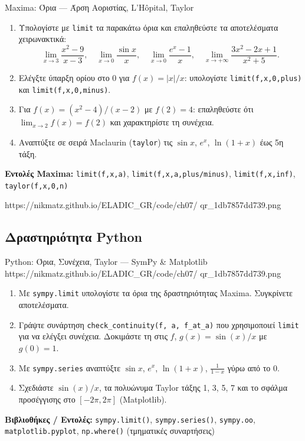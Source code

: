%

\casactivbox%
  {Maxima: Όρια — Άρση Αοριστίας, L'Hôpital, Taylor}%
  {%
    \label{cas:ch7_limits}
    \begin{enumerate}[label=(\alph*),itemsep=2pt]
      \item Υπολογίστε με \texttt{limit} τα παρακάτω όρια και
        επαληθεύστε τα αποτελέσματα χειρωνακτικά:
        \[
          \lim_{x\to 3}\frac{x^2-9}{x-3}, \quad
          \lim_{x\to 0}\frac{\sin x}{x}, \quad
          \lim_{x\to 0}\frac{e^x-1}{x}, \quad
          \lim_{x\to+\infty}\frac{3x^2-2x+1}{x^2+5}.
        \]
      \item Ελέγξτε ύπαρξη ορίου στο 0 για $f(x)=|x|/x$:
        υπολογίστε \texttt{limit(f,x,0,plus)} και
        \texttt{limit(f,x,0,minus)}.
      \item Για $f(x)=(x^2-4)/(x-2)$ με $f(2)=4$: επαληθεύστε
        ότι $\lim_{x\to 2}f(x)=f(2)$ και χαρακτηρίστε τη
        συνέχεια.
      \item Αναπτύξτε σε σειρά Maclaurin (\texttt{taylor}) τις
        $\sin x$, $e^x$, $\ln(1+x)$ έως 5η τάξη.
    \end{enumerate}
    \smallskip
    \textbf{Εντολές Maxima:}
    \texttt{limit(f,x,a)}, \texttt{limit(f,x,a,plus/minus)},
    \texttt{limit(f,x,inf)}, \texttt{taylor(f,x,0,n)}
  }%
  {https://nikmatz.github.io/ELADIC_GR/code/ch07/}%
  {qr_1db7857dd739.png}

\subsection*{Δραστηριότητα Python}

\begin{pybox}{Python: Όρια, Συνέχεια, Taylor — SymPy \& Matplotlib}%
             {https://nikmatz.github.io/ELADIC_GR/code/ch07/}%
             {qr_1db7857dd739.png}
\label{py:ch7_limits}
\begin{enumerate}[label=(\alph*),itemsep=2pt]
  \item Με \texttt{sympy.limit} υπολογίστε τα όρια της
    δραστηριότητας Maxima. Συγκρίνετε αποτελέσματα.
  \item Γράψτε συνάρτηση \texttt{check\_continuity(f, a, f\_at\_a)}
    που χρησιμοποιεί \texttt{limit} για να ελέγξει συνέχεια.
    Δοκιμάστε τη στις $f$, $g(x)=\sin(x)/x$ με $g(0)=1$.
  \item Με \texttt{sympy.series} αναπτύξτε $\sin x$, $e^x$,
    $\ln(1+x)$, $\frac{1}{1-x}$ γύρω από το 0.
  \item Σχεδιάστε $\sin(x)/x$, τα πολυώνυμα Taylor τάξης
    1, 3, 5, 7 και το σφάλμα προσέγγισης στο $[-2\pi,2\pi]$
    (Matplotlib).
\end{enumerate}
\medskip
\textbf{Βιβλιοθήκες / Εντολές:}
\texttt{sympy.limit()}, \texttt{sympy.series()},
\texttt{sympy.oo}, \texttt{matplotlib.pyplot},
\texttt{np.where()} (τμηματικές συναρτήσεις)
\end{pybox}

